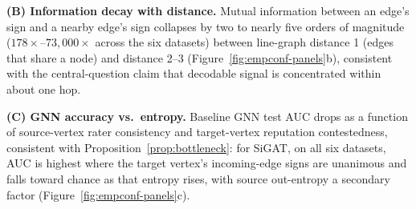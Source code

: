 \documentclass[letterpaper]{article} %
\theoremstyle{plain}
\theoremstyle{definition}
\begin{document}
\textbf{(B) Information decay with distance.} Mutual information between an edge's sign and a nearby edge's sign collapses by two to nearly five orders of magnitude ($178\times$--$73{,}000\times$ across the six datasets) between line-graph distance 1 (edges that share a node) and distance 2--3 (Figure~\ref{fig:empconf-panels}b), consistent with the central-question claim that decodable signal is concentrated within about one hop.

\textbf{(C) GNN accuracy vs.\ entropy.} Baseline GNN test AUC drops as a function of source-vertex rater consistency and target-vertex reputation contestedness, consistent with Proposition~\ref{prop:bottleneck}: for SiGAT, on all six datasets, AUC is highest where the target vertex's incoming-edge signs are unanimous and falls toward chance as that entropy rises, with source out-entropy a secondary factor (Figure~\ref{fig:empconf-panels}c).
\end{document}
